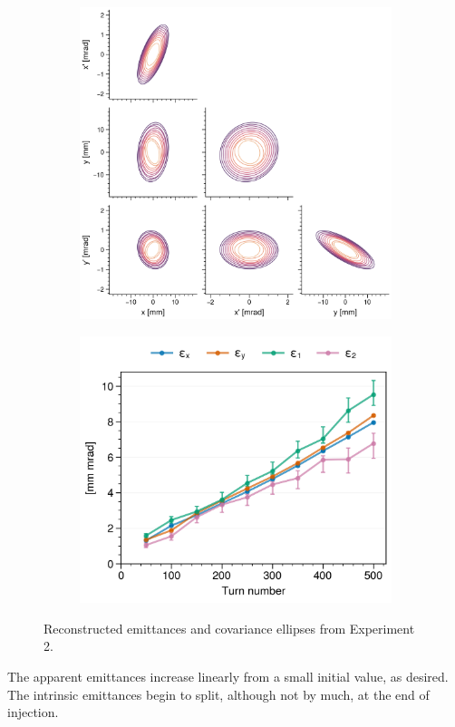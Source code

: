 \begin{figure}[!p]
    \centering
    \begin{subfigure}{0.6\textwidth}
        \includegraphics[width=\textwidth]{Images/chapter5/exp2/corner.png}
    \end{subfigure}
    \hfill
    \begin{subfigure}[t]{0.39\textwidth}
        \includegraphics[width=\textwidth]{Images/chapter5/exp2/emittances.png}
    \end{subfigure}
    \caption{Reconstructed emittances and covariance ellipses from Experiment 2.}
    \label{fig:exp2_emittances}
\end{figure}
%
The apparent emittances increase linearly from a small initial value, as desired. The intrinsic emittances begin to split, although not by much, at the end of injection.

